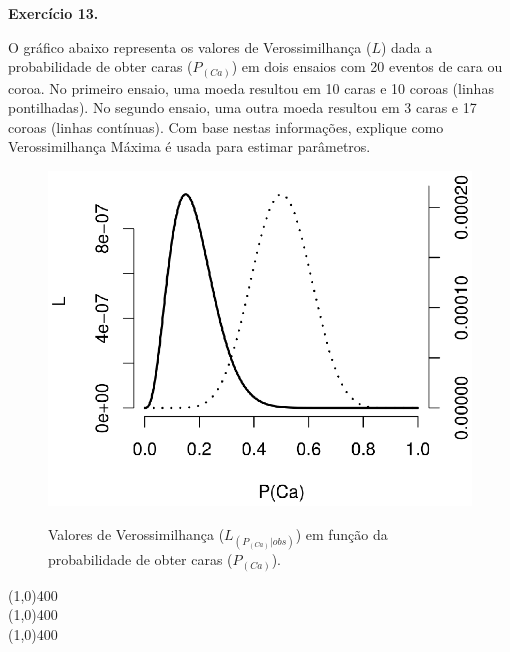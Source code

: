 \begin{refsection}
\begin{blackBlock}{\textbf{Exercício 13.}}\label{tut12:ex:13.2}

O gráfico abaixo representa os valores de Verossimilhança ($L$) dada a probabilidade de obter caras ($P_{(Ca)}$) em dois ensaios com 20 eventos de cara ou coroa. No primeiro ensaio, uma moeda resultou em 10 caras e 10 coroas (linhas pontilhadas). No segundo ensaio, uma outra moeda resultou em 3 caras e 17 coroas (linhas contínuas). Com base nestas informações, explique como Verossimilhança Máxima é usada para estimar parâmetros.

\end{blackBlock}

  \begin{figure}[h!]
       \centering
      {\includegraphics[scale=0.8]{figures/tut12/plot_coins.eps}}
      {\caption{Valores de Verossimilhança ($L_{(P_{(Ca)}|obs)}$) em função da probabilidade de obter caras ($P_{(Ca)}$).}\label{fig:plot_coin}}
  \end{figure}



\begin{center}
\line(1,0){400}\\
\line(1,0){400}\\
\line(1,0){400}\\
\end{center}




\end{refsection}
